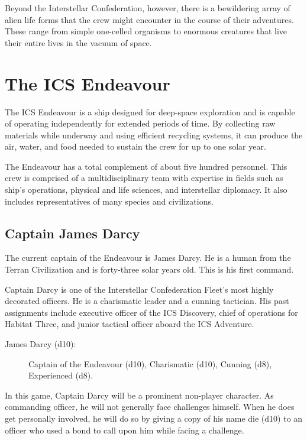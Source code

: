 \documentclass[11pt, a5paper, parskip=half-, DIV=12]{scrartcl}
\begin{document}
Beyond the Interstellar Confederation, however, there is a bewildering array of alien life forms that the crew might encounter in the course of their adventures. These range from simple one-celled organisms to enormous creatures that live their entire lives in the vacuum of space.

\newpage

\section*{The ICS Endeavour}
The ICS Endeavour is a ship designed for deep-space exploration and is capable of operating independently for extended periods of time. By collecting raw materials while underway and using efficient recycling systems, it can produce the air, water, and food needed to sustain the crew for up to one solar year.

The Endeavour has a total complement of about five hundred personnel. This crew is comprised of a multidisciplinary team with expertise in fields such as ship's operations, physical and life sciences, and interstellar diplomacy. It also includes representatives of many species and civilizations.

\subsection*{Captain James Darcy}
The current captain of the Endeavour is James Darcy. He is a human from the Terran Civilization and is forty-three solar years old. This is his first command.

Captain Darcy is one of the Interstellar Confederation Fleet's most highly decorated officers. He is a charismatic leader and a cunning tactician. His past assignments include executive officer of the ICS Discovery, chief of operations for Habitat Three, and junior tactical officer aboard the ICS Adventure.

\begin{description}
	\item[James Darcy (d10):] Captain of the Endeavour (d10), Charismatic (d10), Cunning (d8), Experienced (d8).
\end{description}

In this game, Captain Darcy will be a prominent non-player character. As commanding officer, he will not generally face challenges himself. When he does get personally involved, he will do so by giving a copy of his name die (d10) to an officer who used a bond to call upon him while facing a challenge.
\end{document}
